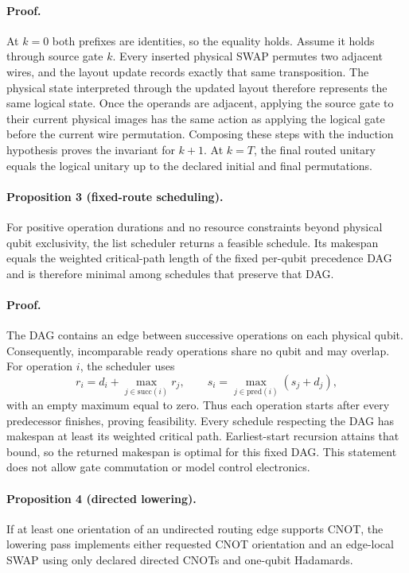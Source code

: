 \documentclass[a4paper,11pt,twocolumn]{article}
\begin{document}
\paragraph{Proof.}
At $k=0$ both prefixes are identities, so the equality holds. Assume it holds
through source gate $k$. Every inserted physical SWAP permutes two adjacent
wires, and the layout update records exactly that same transposition. The
physical state interpreted through the updated layout therefore represents the
same logical state. Once the operands are adjacent, applying the source gate to
their current physical images has the same action as applying the logical gate
before the current wire permutation. Composing these steps with the induction
hypothesis proves the invariant for $k+1$. At $k=T$, the final routed unitary
equals the logical unitary up to the declared initial and final permutations.

\paragraph{Proposition 3 (fixed-route scheduling).}
For positive operation durations and no resource constraints beyond physical
qubit exclusivity, the list scheduler returns a feasible schedule. Its
makespan equals the weighted critical-path length of the fixed per-qubit
precedence DAG and is therefore minimal among schedules that preserve that DAG.

\paragraph{Proof.}
The DAG contains an edge between successive operations on each physical qubit.
Consequently, incomparable ready operations share no qubit and may overlap.
For operation $i$, the scheduler uses
\begin{equation}
 r_i=d_i+\max_{j\in\mathrm{succ}(i)}r_j,
 \qquad
 s_i=\max_{j\in\mathrm{pred}(i)}(s_j+d_j),
 \label{eq:schedule}
\end{equation}
with an empty maximum equal to zero. Thus each operation starts after every
predecessor finishes, proving feasibility. Every schedule respecting the DAG
has makespan at least its weighted critical path. Earliest-start recursion
attains that bound, so the returned makespan is optimal for this fixed DAG.
This statement does not allow gate commutation or model control electronics.

\paragraph{Proposition 4 (directed lowering).}
If at least one orientation of an undirected routing edge supports CNOT, the
lowering pass implements either requested CNOT orientation and an edge-local
SWAP using only declared directed CNOTs and one-qubit Hadamards.
\end{document}
